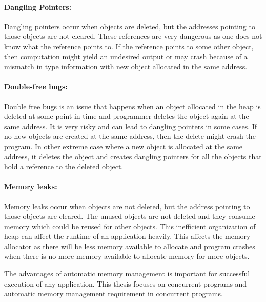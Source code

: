 \paragraph{Dangling Pointers:}
Dangling pointers occur when objects are deleted, but the addresses pointing to those objects are not cleared.
These references are very dangerous as one does not know what the reference points to. If the reference points to some other object, then computation might yield an undesired output or may crash because of a mismatch in type information with new object allocated in the same address. 
\paragraph{Double-free bugs:}
Double free bugs is an issue that happens when an object allocated in the heap is deleted at some point in time and programmer deletes the object again at the same address. It is very risky and can lead to dangling pointers in some cases. If no new objects are created at the same address, then the delete might crash the program. In other extreme case where a new object is allocated at the same address, it deletes the object and creates dangling pointers for all the objects that hold a reference to the deleted object. 
\paragraph{Memory leaks:}
Memory leaks occur when objects are not deleted, but the address pointing to those objects are cleared. The unused objects are not deleted and they consume memory which could be reused for other objects. This inefficient organization of heap can affect the runtime of an application heavily. This affects the memory allocator as there will be less memory available to allocate and program crashes when there is no more memory available to allocate memory for more objects.

\vspace{0.2in}
The advantages of automatic memory management is important for successful execution of any application. This thesis focuses on concurrent programs and automatic memory management requirement in concurrent programs. 

